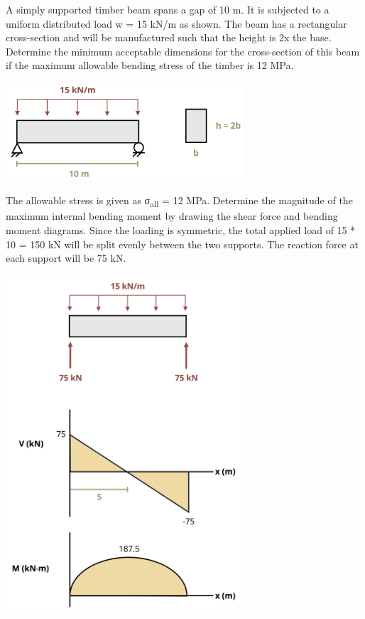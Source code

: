 \documentclass[
  letterpaper,
  DIV=11,
  numbers=noendperiod]{scrreprt}
\begin{document}
\begin{tcolorbox}[enhanced jigsaw, colback=white, colframe=quarto-callout-note-color-frame, leftrule=.75mm, opacitybacktitle=0.6, colbacktitle=quarto-callout-note-color!10!white, arc=.35mm, bottomrule=.15mm, breakable, title={Example 9.4: Design of rectangular cross-section}, left=2mm, titlerule=0mm, toptitle=1mm, toprule=.15mm, opacityback=0, rightrule=.15mm, coltitle=black, bottomtitle=1mm]

A simply supported timber beam spans a gap of 10 m. It is subjected to a
uniform distributed load w = 15 kN/m as shown. The beam has a
rectangular cross-section and will be manufactured such that the height
is 2x the base. Determine the minimum acceptable dimensions for the
cross-section of this beam if the maximum allowable bending stress of
the timber is 12 MPa.

\begin{center}
\includegraphics[width=3.48958in,height=\textheight]{images/CH9 PNGs/Example 9.4 part 1.png}
\end{center}

The allowable stress is given as σ\textsubscript{all} = 12 MPa.
Determine the magnitude of the maximum internal bending moment by
drawing the shear force and bending moment diagrams. Since the loading
is symmetric, the total applied load of 15 * 10 = 150 kN will be split
evenly between the two supports. The reaction force at each support will
be 75 kN.

\begin{center}
\includegraphics[width=3.45833in,height=\textheight]{images/CH9 PNGs/Example 9.4 part 2.png}
\end{center}


\end{tcolorbox}
\end{document}
